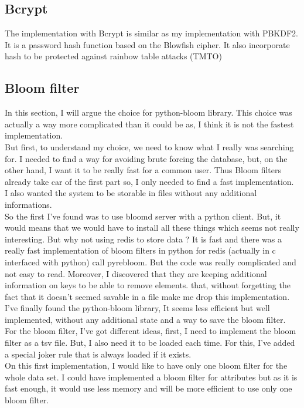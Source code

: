 \documentclass{eplmastersthesis}
\begin{document}
\subsection{Bcrypt}
The implementation with Bcrypt is similar as my implementation with PBKDF2. It is a password hash function based on the Blowfish cipher. It also incorporate hash to be protected against rainbow table attacks (TMTO) 

\subsection{Bloom filter}
In this section, I will argue the choice for python-bloom library. This choice was actually a way more complicated than it could be as, I think it is not the fastest implementation.\\
But first, to understand my choice, we need to know what I really was searching for. I needed to find a way for avoiding brute forcing the database, but, on the other hand, I want it to be really fast for a common user. Thus Bloom filters already take car of the first part so, I only needed to find a fast implementation.\\
I also wanted the system to be storable in files without any additional informations.\\
So the first I've found was to use bloomd server with a python client. But, it would means that we would have to install all these things which seems not really interesting. But why not using redis to store data ? It is fast and there was a really fast implementation of bloom filters in python for redis (actually in c interfaced with python) call pyrebloom. But the code was really complicated and not easy to read. Moreover, I discovered that they are keeping additional information on keys to be able to remove elements. that, without forgetting the fact that it doesn't seemed savable in a file make me drop this implementation.\\
I've finally found the python-bloom library, It seems less efficient but well implemented, without any additional state and a way to save the bloom filter.\\

For the bloom filter, I've got different ideas, first, I need to implement the bloom filter as a tsv file. But, I also need it to be loaded each time. For this, I've added a special joker rule that is always loaded if it exists.\\
On this first implementation, I would like to have only one bloom filter for the whole data set. I could have implemented a bloom filter for attributes but as it is fast enough, it would use less memory and will be more efficient to use only one bloom filter.\\
\end{document}
